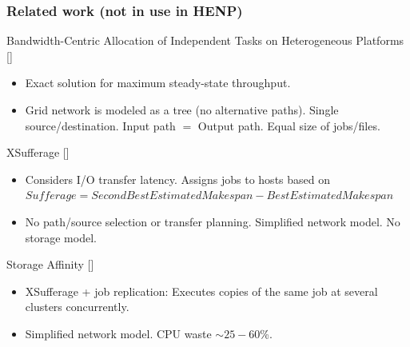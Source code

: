 \documentclass{beamer}
\begin{document}
\begin{frame}\frametitle{Related work (not in use in HENP)} 	
\begin{footnotesize}
\begin{block}{Bandwidth-Centric Allocation of Independent Tasks on Heterogeneous Platforms [\cite{Trees}]}  
		\begin{itemize}
			\item Exact solution for maximum steady-state throughput. 
			\item Grid network is modeled as a tree (no alternative paths). Single source/destination. Input path $=$ Output path. Equal size of jobs/files.		
		\end{itemize}
 	\end{block}

\begin{block}{XSufferage [\cite{casanova2000heuristics}]
}	
\begin{itemize}
 	 \item Considers I/O transfer latency. Assigns jobs to hosts based on $Sufferage = SecondBestEstimatedMakespan - BestEstimatedMakespan$
 	 \item No path/source selection or transfer planning. Simplified network model. No storage model.
 	 \end{itemize}
\end{block}  	
 	
 	
\begin{block}{Storage Affinity [\cite{santos2005exploiting}]}	
	 \begin{itemize}
	 \item XSufferage + job replication: Executes copies of the same job at several clusters concurrently.
	 \item Simplified network model. CPU waste $\sim 25-60$\%.
 	  \end{itemize}
\end{block}

	 
\end{footnotesize}
\end{frame}
\end{document}
